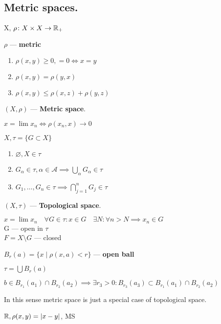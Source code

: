 \subsection{Metric spaces.}

X, $\rho\colon X \times X \to \mathbb{R}_+$
\begin{defn}$\rho$ --- \textbf{metric}
  \begin{enumerate} 
    \item $\rho(x, y) \geq 0, = 0 \iff x = y$
    \item $\rho(x, y) = \rho (y, x)$
    \item $\rho(x, y) \leq \rho (x, z) + \rho (y, z)$
  \end{enumerate}
\end{defn}
\begin{defn}$(X, \rho)$ --- \textbf{Metric space}.\end{defn}
\begin{defn}$x = \lim x_{n} \iff \rho(x_{n}, x) \rightarrow 0$\end{defn}
\vspace{5mm}
$X, \tau = \{G \subset X\}$
\begin{enumerate}
  \item $\varnothing, X \in \tau$
  \item $G_\alpha \in \tau, \alpha \in \mathscr{A} \implies \bigcup\limits_\alpha G_\alpha \in \tau$
  \item $G_1, \dotsc, G_n \in \tau \implies \bigcap\limits_{j = 1}^n G_j \in \tau$
\end{enumerate}
\begin{defn}$(X, \tau)$ --- \textbf{Topological space}.\end{defn}
$x = \lim x_n \quad \forall G \in \tau: x \in G \quad \exists N: \forall n > N \implies x_n \in G$\\
G --- open in $\tau$ \\
$F = X \setminus G$ --- closed
\begin{defn}
  $B_r (a) = \{x\mid \rho(x, a) < r\}$ --- \textbf{open ball}
\end{defn}
\noindent
$\tau = \bigcup B_r (a)$
\begin{stm}
  $b \in B_{r_1} (a_1) \cap B_{r_2} (a_2) \implies \exists r_3 > 0: B_{r_3}
  (a_3) \subset B_{r_1} (a_1) \cap B_{r_2} (a_2)$
\end{stm}
\noindent
In this sense metric space is just a special case of topological space.
\begin{ex}
  $\mathbb{R}, \rho(x, y) = |x - y|$, MS
\end{ex}
